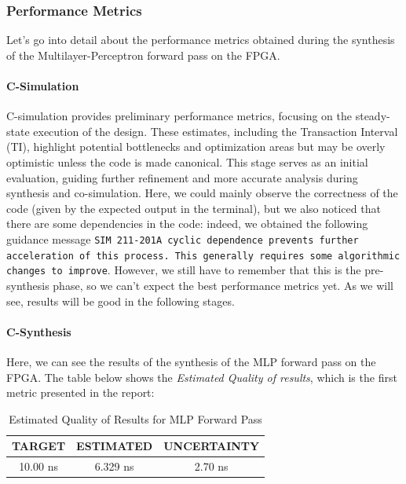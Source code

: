 \documentclass{article}
\begin{document}
\subsubsection{Performance Metrics}
Let's go into detail about the performance metrics obtained during the synthesis of the Multilayer-Perceptron forward pass on the FPGA.

\paragraph{C-Simulation}  
C-simulation provides preliminary performance metrics, focusing on the steady-state execution of the design. These estimates, including the Transaction Interval (TI), highlight potential bottlenecks and optimization areas but may be overly optimistic unless the code is made canonical. This stage serves as an initial evaluation, guiding further refinement and more accurate analysis during synthesis and co-simulation.  
Here, we could mainly observe the correctness of the code (given by the expected output in the terminal), but we also noticed that there are some dependencies in the code: indeed, we obtained the following guidance message \texttt{SIM 211-201A cyclic dependence prevents further acceleration of this process. This generally requires some algorithmic changes to improve}. However, we still have to remember that this is the pre-synthesis phase, so we can't expect the best performance metrics yet. As we will see, results will be good in the following stages. 


\paragraph{C-Synthesis}
Here, we can see the results of the synthesis of the MLP forward pass on the FPGA. The table below shows the \textit{Estimated Quality of results}, which is the first metric presented in the report:

\begin{table}[H]
    \centering
    \begin{tabular}{|c|c|c|}
        \hline
        \textbf{TARGET} & \textbf{ESTIMATED} & \textbf{UNCERTAINTY} \\
        \hline
        10.00 ns & 6.329 ns & 2.70 ns \\
        \hline
    \end{tabular}
    \caption{\centering Estimated Quality of Results for MLP Forward Pass}
    \label{tab:mlp-quality}
\end{table}
\end{document}
